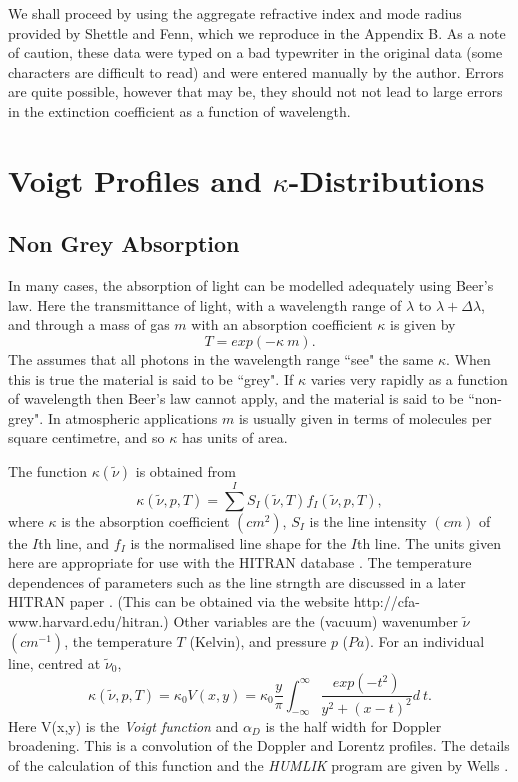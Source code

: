 \documentclass[12pt]{article}
\begin{document}
We shall proceed by using the aggregate refractive index and mode radius 
provided by Shettle and Fenn, which we reproduce in the Appendix B. 
As a note of caution, these data were typed on a bad typewriter in the original 
data (some characters are difficult
to read) and were entered manually by the author. Errors are quite possible, however
 that may be, they should not  not lead to
large errors in the  extinction coefficient as a function of wavelength.


\newpage

\appendix

\section{Voigt Profiles and $\kappa$-Distributions} 

\subsection{Non Grey Absorption}

In many cases, the absorption of light can be modelled adequately
using Beer's law. Here the transmittance of light, with a wavelength
range of $\lambda$ to $\lambda+\Delta \lambda$, and through a mass
of gas $m$ with an absorption coefficient $\kappa$ is given by
\begin{equation}
    T=exp(-\kappa\>m).
\end{equation}
The assumes that all photons in the wavelength range ``see" the same
$\kappa$. When this is true the material is said to be ``grey".
If $\kappa$ varies very rapidly as a function of wavelength
then Beer's law cannot apply, and the material is said to be ``non-grey".
In atmospheric applications $m$ is usually given in terms of molecules
 per square centimetre, and so $\kappa$ has units of area.


The function $\kappa(\tilde{\nu})$ is obtained from
\begin{equation}
    \kappa(\tilde{\nu},p,T)=\sum^I S_I(\tilde{\nu},T) f_I(\tilde{\nu},p,T),
\end{equation}
where $\kappa$ is the absorption coefficient $(cm^{2})$, $S_I$
is the line intensity $(cm)$ of the $I$th line, and $f_I$
is the normalised line shape for the $I$th line.
The units given here are appropriate for use with the HITRAN database
\cite{RothmanETAL:Mybib}. The temperature dependences of parameters such as the line strngth
are discussed in a later HITRAN paper \cite{RothmanETAL96:Mybib}.
(This can be obtained via the website http://cfa-www.harvard.edu/hitran.)
Other variables are the (vacuum) wavenumber $\tilde{\nu}$ $(cm^{-1})$, the temperature $T$ (Kelvin),
and pressure $p$ ($Pa$). For an individual line, centred at $\tilde{\nu}_0$, 
\begin{equation}
    \kappa(\tilde{\nu},p,T)=\kappa_0 V(x,y)=  \kappa_0 \frac{y}{\pi} \int_{-\infty}^{\infty} \frac{exp(-t^2)}{y^2+(x-t)^2} d\>t.
\end{equation}
Here V(x,y) is the {\it Voigt function} and $\alpha_D$ is the half width for Doppler broadening. This is a convolution of the
Doppler and Lorentz profiles. The details of the calculation of this function and the {\it HUMLIK} program
 are given by Wells \cite{BobWells:Mybib}.
\end{document}

